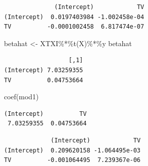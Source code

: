 \documentclass[
]{article}
\newenvironment{Shaded}{\begin{snugshade}}{\end{snugshade}}
\newcommand{\CommentTok}[1]{\textcolor[rgb]{0.56,0.35,0.01}{\textit{#1}}}
\newcommand{\DecValTok}[1]{\textcolor[rgb]{0.00,0.00,0.81}{#1}}
\newcommand{\FunctionTok}[1]{\textcolor[rgb]{0.00,0.00,0.00}{#1}}
\newcommand{\NormalTok}[1]{#1}
\newcommand{\OtherTok}[1]{\textcolor[rgb]{0.56,0.35,0.01}{#1}}
\newcommand{\SpecialCharTok}[1]{\textcolor[rgb]{0.00,0.00,0.00}{#1}}
\begin{document}
\begin{Shaded}
\end{Shaded}

\begin{verbatim}
              (Intercept)            TV
(Intercept)  0.0197403984 -1.002458e-04
TV          -0.0001002458  6.817474e-07
\end{verbatim}

\begin{Shaded}
\begin{Highlighting}[]
\NormalTok{betahat }\OtherTok{\textless{}{-}}\NormalTok{ XTXI}\SpecialCharTok{\%*\%}\FunctionTok{t}\NormalTok{(X)}\SpecialCharTok{\%*\%}\NormalTok{y}
\NormalTok{betahat}
\end{Highlighting}
\end{Shaded}

\begin{verbatim}
                  [,1]
(Intercept) 7.03259355
TV          0.04753664
\end{verbatim}

\begin{Shaded}
\begin{Highlighting}[]
\FunctionTok{coef}\NormalTok{(mod1)}
\end{Highlighting}
\end{Shaded}

\begin{verbatim}
(Intercept)          TV 
 7.03259355  0.04753664 
\end{verbatim}

\begin{Shaded}
\end{Shaded}

\begin{verbatim}
             (Intercept)            TV
(Intercept)  0.209620158 -1.064495e-03
TV          -0.001064495  7.239367e-06
\end{verbatim}
\end{document}
